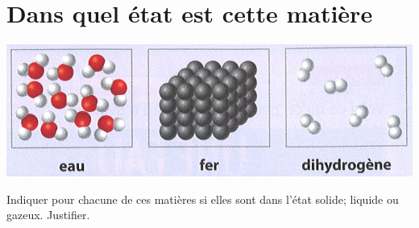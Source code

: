 \section{Dans quel état est cette matière}\label{ex:etat2}

\begin{center}
	\includegraphics[scale=0.4]{img/etats}
\end{center}

\begin{questions}
\question[] Indiquer pour chacune de ces matières si elles sont dans l'état solide; liquide ou gazeux. Justifier.

\end{questions}